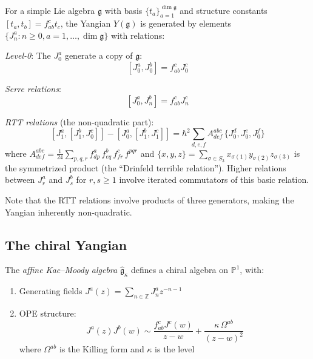 \begin{definition}\label{def:yangian-kps}
For a simple Lie algebra $\mathfrak{g}$ with basis $\{t_a\}_{a=1}^{\dim \mathfrak{g}}$ and structure constants $[t_a, t_b] = f_{ab}^c t_c$, the Yangian $Y(\mathfrak{g})$ is generated by elements $\{J_n^a : n \geq 0, a = 1, \ldots, \dim \mathfrak{g}\}$ with relations:

\emph{Level-0}: The $J_0^a$ generate a copy of $\mathfrak{g}$:
\[
[J_0^a, J_0^b] = f_{ab}^c J_0^c
\]

\emph{Serre relations}: 
\[
[J_0^a, J_n^b] = f_{ab}^c J_n^c
\]

\emph{RTT relations} (the non-quadratic part):
\[
[J_1^a, [J_1^b, J_0^c]] - [J_0^a, [J_1^b, J_1^c]] = \hbar^2 \sum_{d,e,f} A^{abc}_{def}\, \{J_0^d, J_0^e, J_0^f\}
\]
where $A^{abc}_{def} = \tfrac{1}{24}\sum_{p,q,r} f^a_{dp}\, f^b_{eq}\, f^c_{fr}\, f^{pqr}$ and
$\{x,y,z\} = \sum_{\sigma \in S_3} x_{\sigma(1)} y_{\sigma(2)} z_{\sigma(3)}$ is the
symmetrized product (the ``Drinfeld terrible relation'').  Higher relations between
$J_r^a$ and $J_s^b$ for $r,s \geq 1$ involve iterated commutators of this basic relation.
\end{definition}

Note that the RTT relations involve products of three generators, making the Yangian inherently non-quadratic.

\subsection{The chiral Yangian}

\begin{theorem}
\label{thm:chiral-yangian-km}
The \emph{affine Kac--Moody algebra} $\hat{\mathfrak{g}}_\kappa$ defines a chiral algebra on $\mathbb{P}^1$, with:
\begin{enumerate}
\item Generating fields $J^a(z) = \sum_{n \in \mathbb{Z}} J_n^a z^{-n-1}$
\item OPE structure:
\[
J^a(z)J^b(w) \sim \frac{f_{ab}^c J^c(w)}{z-w} + \frac{\kappa\, \Omega^{ab}}{(z-w)^2}
\]
where $\Omega^{ab}$ is the Killing form and $\kappa$ is the level
\end{enumerate}
\end{theorem}

